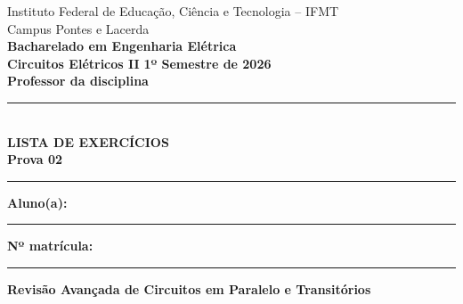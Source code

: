\documentclass[10pt,a4paper]{article}
\begin{document}
\begin{center}
    {\small Instituto Federal de Educação, Ciência e Tecnologia -- IFMT}\\[-1mm]
    {\small Campus Pontes e Lacerda}\\[1mm]
    {\bfseries Bacharelado em Engenharia Elétrica}\\
    {\bfseries Circuitos Elétricos II} \hfill {\bfseries 1º Semestre de 2026}\\[1mm]
    {\bfseries Professor da disciplina}\\[3mm]
    {\color{ifmtblue}\rule{0.95\linewidth}{0.5pt}}\\[1mm]
    {\fontsize{20}{22}\selectfont\bfseries\color{ifmtblue} LISTA DE EXERCÍCIOS}\\[1mm]
    {\Large\bfseries\color{ifmtblue} Prova 02}\\[1mm]
    {\color{ifmtblue}\rule{0.95\linewidth}{0.5pt}}
\end{center}

\vspace{1mm}
\textbf{Aluno(a): }\rule{0.68\linewidth}{0.4pt}\hfill
\textbf{Nº matrícula: }\rule{0.18\linewidth}{0.4pt}

\vspace{2mm}
{\Large\bfseries Revisão Avançada de Circuitos em Paralelo e Transitórios}

\vspace{2mm}
\small
\end{document}
